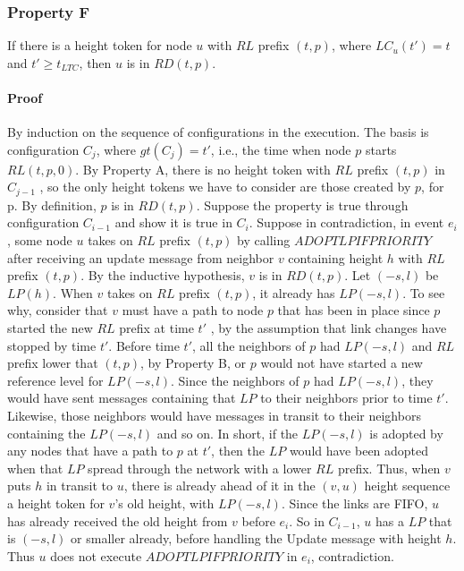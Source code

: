 \documentclass{article}
\begin{document}
\subsubsection{Property F}
If there is a height token for node $u$ with $RL$ prefix $(t, p)$, where $LC_u(t') = t$ and $t' \geq t_{LTC}$, then $u$ is in $RD(t, p)$.\\
\paragraph{Proof}
By induction on the sequence of configurations in the execution. The basis is configuration $C_j$, where $gt(C_j) = t'$, i.e., the time when node $p$ starts $RL(t, p, 0)$. By Property A, there is no height token with $RL$ prefix $(t, p)$ in $C_{j − 1}$ , so the only height tokens we have to consider are those created by $p$, for p. By definition, $p$ is in $RD(t, p)$. Suppose the property is true through configuration $C_{i − 1}$ and show it is true in $C_i$. Suppose in contradiction, in event $e_i$, some node $u$ takes on $RL$ prefix $(t, p)$ by calling $ADOPTLPIFPRIORITY$ after receiving an update message from neighbor $v$ containing height $h$ with $RL$ prefix $(t, p)$. By the inductive hypothesis, $v$ is in $RD(t, p)$. Let $(−s, l)$ be $LP(h)$. When $v$ takes on $RL$ prefix $(t, p)$, it already has $LP(−s, l)$. To see why, consider that $v$ must have a path to node $p$ that has been in place since $p$ started the new $RL$ prefix at time $t'$ , by the assumption that link changes have stopped by time $t'$. Before time $t'$, all the neighbors of $p$ had $LP(−s, l)$ and $RL$ prefix lower that $(t, p)$, by Property B, or $p$ would not have started a new reference level for $LP(−s, l)$. Since the neighbors of $p$ had $LP(−s, l)$, they would have sent messages containing that $LP$ to their neighbors prior to time $t'$. Likewise, those neighbors would have messages in transit to their neighbors containing the $LP(−s, l)$ and so on. In short, if the $LP(−s, l)$ is adopted by any nodes that have a path to $p$ at $t'$, then the $LP$ would have been adopted when that $LP$ spread through the network with a lower $RL$ prefix. Thus, when $v$ puts $h$ in transit to $u$, there is already ahead of it in the $(v, u)$ height sequence a height token for $v$’s old height, with $LP(−s, l)$. Since the links are FIFO, $u$ has already received the old height from $v$ before $e_i$. So in $C_{i − 1}$, $u$ has a $LP$ that is $(−s, l)$ or smaller already, before handling the Update message with height $h$. Thus $u$ does not execute $ADOPTLPIFPRIORITY$ in $e_i$, contradiction.
\end{document}
